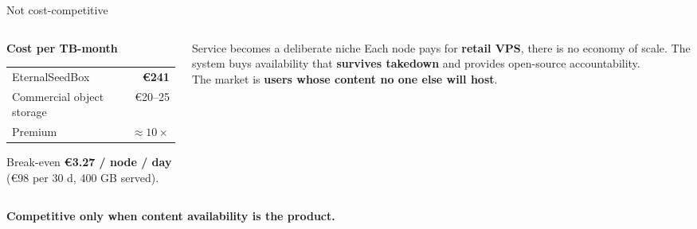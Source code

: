 {
\footerinfootnotestrue %
\begin{frame}{Not cost-competitive}
  \medskip
  \small
  \begin{columns}[T, onlytextwidth]
    \begin{column}{0.44\textwidth}
    
      \medskip
      \medskip
      \textbf{Cost per TB-month}

      \smallskip
      \begin{tabular}{@{}lr@{}}
        EternalSeedBox            & \textbf{€241} \\
        Commercial object storage & €20--25 \\
        \hline
        Premium                   & \(\approx 10\times\) \\
      \end{tabular}

      \medskip
      {\footnotesize Break-even \textbf{€3.27 / node / day}
      (€98 per 30 d, 400 GB served).}
    \end{column}
    \begin{column}{0.52\textwidth}
      \medskip

      \begin{block}{Service becomes a deliberate niche}
        Each node pays for \textbf{retail VPS}, there is no economy of scale. The system buys availability that \textbf{survives takedown} and provides open-source accountability. \\

        The market is \textbf{users whose content no one else will host}.
      \end{block}
    \end{column}
  \end{columns}
  \medskip
  \medskip  
  \textcolor{tud Orange}{\textbf{Competitive only when content availability is the
  product.}}
\end{frame}
}

